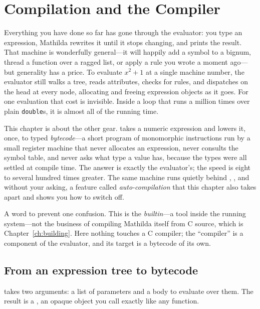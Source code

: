 \chapter{Compilation and the Compiler}
\label{ch:compilation}

Everything you have done so far has gone through the evaluator: you type an
expression, Mathilda rewrites it until it stops changing, and prints the result.
That machine is wonderfully general---it will happily add a symbol to a bignum,
thread a function over a ragged list, or apply a rule you wrote a moment ago---but
generality has a price. To evaluate \(x^2 + 1\) at a single machine number, the
evaluator still walks a tree, reads attributes, checks for rules, and dispatches
on the head at every node, allocating and freeing expression objects as it goes.
For one evaluation that cost is invisible. Inside a loop that runs a million
times over plain \texttt{double}s, it is almost all of the running time.

This chapter is about the other gear.  takes a numeric expression and
lowers it, once, to typed \emph{bytecode}---a short
program of monomorphic instructions run by a small register machine that never
allocates an expression, never consults the symbol table, and never asks what
type a value has, because the types were all settled at compile time. The answer
is exactly the evaluator's; the speed is eight to several hundred times
greater. The same machine runs quietly behind
, ,  and  without your asking, a feature
called \emph{auto-compilation} that this chapter also
takes apart and shows you how to switch off.

A word to prevent one confusion. This is the  \emph{builtin}---a
tool inside the running system---not the business of compiling Mathilda itself
from C source, which is Chapter~\ref{ch:building}. Here nothing touches a C
compiler; the ``compiler'' is a component of the evaluator, and its target is a
bytecode of its own.

\section{From an expression tree to bytecode}
\label{sec:compile-basics}

 takes two arguments: a list of parameters and a body to evaluate over
them. The result is a , an opaque object you call exactly
like any function.

